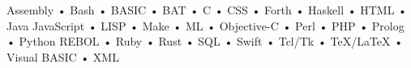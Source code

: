 Assembly • Bash • BASIC • BAT • C • CSS • Forth • Haskell • HTML • Java JavaScript • LISP • Make • ML • Objective-C • Perl • PHP • Prolog • Python REBOL • Ruby • Rust • SQL • Swift • Tcl/Tk • TeX/LaTeX • Visual BASIC • XML